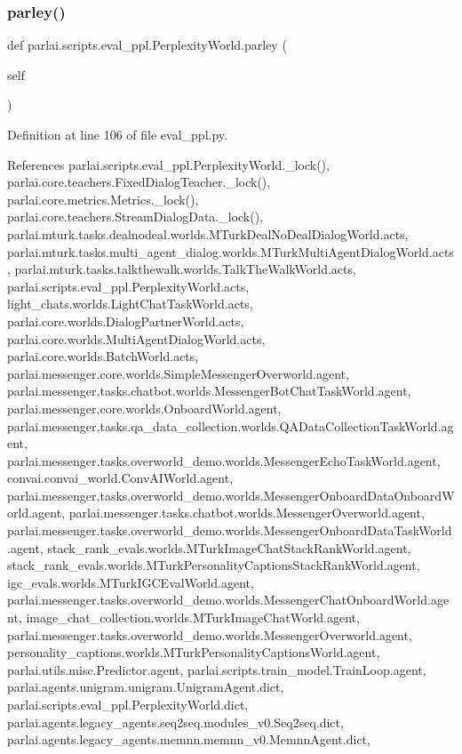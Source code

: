\subsubsection{\texorpdfstring{parley()}{parley()}}
{\footnotesize\ttfamily def parlai.\+scripts.\+eval\+\_\+ppl.\+Perplexity\+World.\+parley (\begin{DoxyParamCaption}\item[{}]{self }\end{DoxyParamCaption})}



Definition at line 106 of file eval\+\_\+ppl.\+py.



References parlai.\+scripts.\+eval\+\_\+ppl.\+Perplexity\+World.\+\_\+lock(), parlai.\+core.\+teachers.\+Fixed\+Dialog\+Teacher.\+\_\+lock(), parlai.\+core.\+metrics.\+Metrics.\+\_\+lock(), parlai.\+core.\+teachers.\+Stream\+Dialog\+Data.\+\_\+lock(), parlai.\+mturk.\+tasks.\+dealnodeal.\+worlds.\+M\+Turk\+Deal\+No\+Deal\+Dialog\+World.\+acts, parlai.\+mturk.\+tasks.\+multi\+\_\+agent\+\_\+dialog.\+worlds.\+M\+Turk\+Multi\+Agent\+Dialog\+World.\+acts, parlai.\+mturk.\+tasks.\+talkthewalk.\+worlds.\+Talk\+The\+Walk\+World.\+acts, parlai.\+scripts.\+eval\+\_\+ppl.\+Perplexity\+World.\+acts, light\+\_\+chats.\+worlds.\+Light\+Chat\+Task\+World.\+acts, parlai.\+core.\+worlds.\+Dialog\+Partner\+World.\+acts, parlai.\+core.\+worlds.\+Multi\+Agent\+Dialog\+World.\+acts, parlai.\+core.\+worlds.\+Batch\+World.\+acts, parlai.\+messenger.\+core.\+worlds.\+Simple\+Messenger\+Overworld.\+agent, parlai.\+messenger.\+tasks.\+chatbot.\+worlds.\+Messenger\+Bot\+Chat\+Task\+World.\+agent, parlai.\+messenger.\+core.\+worlds.\+Onboard\+World.\+agent, parlai.\+messenger.\+tasks.\+qa\+\_\+data\+\_\+collection.\+worlds.\+Q\+A\+Data\+Collection\+Task\+World.\+agent, parlai.\+messenger.\+tasks.\+overworld\+\_\+demo.\+worlds.\+Messenger\+Echo\+Task\+World.\+agent, convai.\+convai\+\_\+world.\+Conv\+A\+I\+World.\+agent, parlai.\+messenger.\+tasks.\+overworld\+\_\+demo.\+worlds.\+Messenger\+Onboard\+Data\+Onboard\+World.\+agent, parlai.\+messenger.\+tasks.\+chatbot.\+worlds.\+Messenger\+Overworld.\+agent, parlai.\+messenger.\+tasks.\+overworld\+\_\+demo.\+worlds.\+Messenger\+Onboard\+Data\+Task\+World.\+agent, stack\+\_\+rank\+\_\+evals.\+worlds.\+M\+Turk\+Image\+Chat\+Stack\+Rank\+World.\+agent, stack\+\_\+rank\+\_\+evals.\+worlds.\+M\+Turk\+Personality\+Captions\+Stack\+Rank\+World.\+agent, igc\+\_\+evals.\+worlds.\+M\+Turk\+I\+G\+C\+Eval\+World.\+agent, parlai.\+messenger.\+tasks.\+overworld\+\_\+demo.\+worlds.\+Messenger\+Chat\+Onboard\+World.\+agent, image\+\_\+chat\+\_\+collection.\+worlds.\+M\+Turk\+Image\+Chat\+World.\+agent, parlai.\+messenger.\+tasks.\+overworld\+\_\+demo.\+worlds.\+Messenger\+Overworld.\+agent, personality\+\_\+captions.\+worlds.\+M\+Turk\+Personality\+Captions\+World.\+agent, parlai.\+utils.\+misc.\+Predictor.\+agent, parlai.\+scripts.\+train\+\_\+model.\+Train\+Loop.\+agent, parlai.\+agents.\+unigram.\+unigram.\+Unigram\+Agent.\+dict, parlai.\+scripts.\+eval\+\_\+ppl.\+Perplexity\+World.\+dict, parlai.\+agents.\+legacy\+\_\+agents.\+seq2seq.\+modules\+\_\+v0.\+Seq2seq.\+dict, parlai.\+agents.\+legacy\+\_\+agents.\+memnn.\+memnn\+\_\+v0.\+Memnn\+Agent.\+dict, 